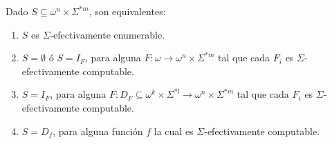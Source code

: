  \begin{theorem}
    \PN Dado $S \subseteq \omega^{n} \times \Sigma^{\ast m}$, son equivalentes:

    \begin{enumerate}
      \item $S$ es $\Sigma$-efectivamente enumerable.
      \item $S = \emptyset$ ó $S = I_{F}$, para alguna $F: \omega \rightarrow \omega^{n} \times \Sigma^{\ast m}$ tal que
        cada $F_{i}$ es $\Sigma$-efectivamente computable.
      \item $S = I_{F}$, para alguna $F:D_{F} \subseteq \omega^{k} \times \Sigma^{\ast l} \rightarrow \omega^{n} \times
        \Sigma^{\ast m} $ tal que cada $F_{i}$ es $\Sigma$-efectivamente computable.
      \item $S = D_{f}$, para alguna función $f$ la cual es $\Sigma$-efectivamente computable.
    \end{enumerate}
  \end{theorem}

